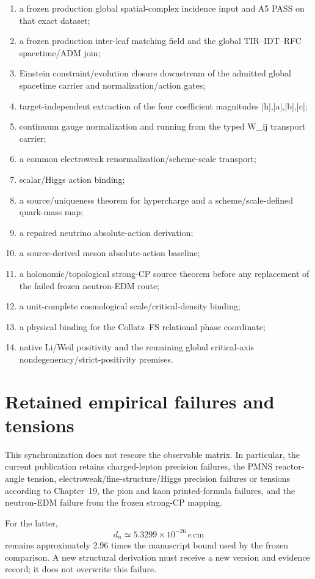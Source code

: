 \documentclass[11pt,a4paper,twoside]{book}
\def\({}%
\def\){}%
\theoremstyle{definition}
\begin{document}
\begin{enumerate}
\item a frozen production global spatial-complex incidence input and A5 PASS on
that exact dataset;
\item a frozen production inter-leaf matching field and the global TIR--IDT--RFC
spacetime/ADM join;
\item Einstein constraint/evolution closure downstream of the admitted global
spacetime carrier and normalization/action gates;
\item target-independent extraction of the four coefficient magnitudes
\(|h|,|a|,|b|,|c|\);
\item continuum gauge normalization and running from the typed \(W_{ij}\)
transport carrier;
\item a common electroweak renormalization/scheme-scale transport;
\item scalar/Higgs action binding;
\item a source/uniqueness theorem for hypercharge and a scheme/scale-defined
quark-mass map;
\item a repaired neutrino absolute-action derivation;
\item a source-derived meson absolute-action baseline;
\item a holonomic/topological strong-CP source theorem before any replacement
of the failed frozen neutron-EDM route;
\item a unit-complete cosmological scale/critical-density binding;
\item a physical binding for the Collatz--FS relational phase coordinate;
\item native Li/Weil positivity and the remaining global critical-axis
nondegeneracy/strict-positivity premises.
\end{enumerate}

\section{Retained empirical failures and tensions}

This synchronization does not rescore the observable matrix.  In particular,
the current publication retains charged-lepton precision failures, the PMNS
reactor-angle tension, electroweak/fine-structure/Higgs precision failures or
tensions according to Chapter~19, the pion and kaon printed-formula failures,
and the neutron-EDM failure from the frozen strong-CP mapping.

For the latter,
\[
d_n\simeq5.3299\times10^{-26}\,e\,\mathrm{cm}
\]
remains approximately \(2.96\) times the manuscript bound used by the frozen
comparison.  A new structural derivation must receive a new version and evidence
record; it does not overwrite this failure.
\end{document}
